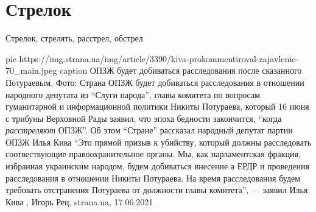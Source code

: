  
 
 
 
 
\chapter{Стрелок}
\label{sec:slova.strelok}

Стрелок, стрелять, расстрел, обстрел

\ifcmt
  pic https://img.strana.ua/img/article/3390/kiva-prokommentiroval-zajavlenie-70_main.jpeg
	caption ОПЗЖ будет добиваться расследования после сказанного Потураевым. Фото: Страна 
\fi
ОПЗЖ будет добиваться расследования в отношении народного депутата из
\enquote{Слуги народа}, главы комитета по вопросам гуманитарной и
информационной политики Никиты Потураева, который 16 июня с трибуны Верховной
Рады заявил, что эпоха бедности закончится, \enquote{когда \emph{расстреляют}
ОПЗЖ}.  Об этом \enquote{Стране} рассказал народный депутат партии ОПЗЖ Илья
Кива \enquote{Это прямой призыв к убийству, который должны расследовать
соотвествующие правоохранительное органы. Мы, как парламентская фракция,
избранная украинским народом, будем добиваться внесение а ЕРДР и проведения
расследования в отношении Никиты Потураева. На время расследования будем
требовать отстранения Потураева от должности главы комитета}, — заявил Илья
Кива
, 
Игорь Рец, strana.ua, 17.06.2021
